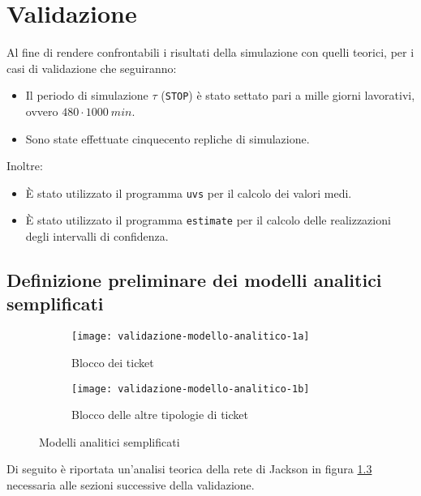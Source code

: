 \chapter{Validazione}\label{chp:validazione}
Al fine di rendere confrontabili i risultati della simulazione con quelli teorici, per i casi di validazione che seguiranno: 
\begin{itemize}
\item Il periodo di simulazione $\tau$ (\texttt{STOP}) è stato settato pari a mille giorni lavorativi, ovvero $480\cdot 1000\ min$.
\item Sono state effettuate cinquecento repliche di simulazione. 
\end{itemize}

Inoltre:
\begin{itemize}
\item È stato utilizzato il programma \texttt{uvs} per il calcolo dei valori medi.
\item È stato utilizzato il programma \texttt{estimate} per il calcolo delle realizzazioni degli intervalli di confidenza.
\end{itemize}

\section{Definizione preliminare dei modelli analitici semplificati}
\begin{figure}[ht]
\centering
\begin{subfigure}[b]{0.475\textwidth}  
\centering 
\texttt{[image: validazione-modello-analitico-1a]}
\caption{Blocco dei ticket \sr{}}    
\label{fig:validazione-modello-analitico-1a}
\end{subfigure}
\hfill 
\begin{subfigure}[b]{0.475\textwidth}
\centering
\texttt{[image: validazione-modello-analitico-1b]}
\caption{Blocco delle altre tipologie di ticket}    
\label{fig:validazione-modello-analitico-1b}
\end{subfigure}
\caption{Modelli analitici semplificati}
\label{fig:validazione-modello-analitico-1}
\end{figure}

Di seguito è riportata un'analisi teorica della rete di Jackson in figura \ref{fig:validazione-modello-analitico-1} necessaria alle sezioni successive della validazione.


